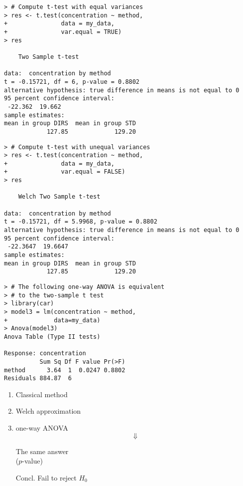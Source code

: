 \begin{frame}[fragile]
\small
	\begin{minipage}{0.48\textwidth}
	\begin{lstlisting}
> # Compute t-test with equal variances
> res <- t.test(concentration ~ method,
+               data = my_data,
+               var.equal = TRUE)
> res

	Two Sample t-test

data:  concentration by method
t = -0.15721, df = 6, p-value = 0.8802
alternative hypothesis: true difference in means is not equal to 0
95 percent confidence interval:
 -22.362  19.662
sample estimates:
mean in group DIRS  mean in group STD
            127.85             129.20
	\end{lstlisting}
	\end{minipage}
	\hfill
	\begin{minipage}{0.5\textwidth}
	\begin{lstlisting}
> # Compute t-test with unequal variances
> res <- t.test(concentration ~ method,
+               data = my_data,
+               var.equal = FALSE)
> res

	Welch Two Sample t-test

data:  concentration by method
t = -0.15721, df = 5.9968, p-value = 0.8802
alternative hypothesis: true difference in means is not equal to 0
95 percent confidence interval:
 -22.3647  19.6647
sample estimates:
mean in group DIRS  mean in group STD
            127.85             129.20
	\end{lstlisting}
	\end{minipage}
	\vspace{-3em}

\begin{minipage}{0.47\textwidth}
	\begin{lstlisting}
> # The following one-way ANOVA is equivalent
> # to the two-sample t test
> library(car)
> model3 = lm(concentration ~ method,
+             data=my_data)
> Anova(model3)
Anova Table (Type II tests)

Response: concentration
          Sum Sq Df F value Pr(>F)
method      3.64  1  0.0247 0.8802
Residuals 884.87  6
	\end{lstlisting}
		\end{minipage}
\hfill
\begin{minipage}{0.4\textwidth}
\vspace{-1em}
	\begin{enumerate}
		\item Classical method
		\item Welch approximation
		\item one-way ANOVA
			\[\Downarrow\]
			\begin{center}The same answer \\($p$-value)
			\end{center}
		\item[Concl.] Fail to reject $H_0$
	\end{enumerate}
\end{minipage}
\end{frame}
